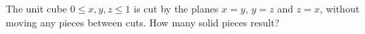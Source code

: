 The unit cube $0\le x,y,z\le1$ is cut by the planes $x=y$, $y=z$ and $z=x$, without moving any pieces between cuts. How many solid pieces result?
